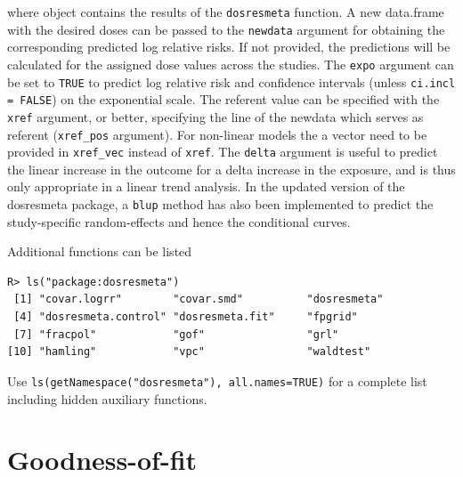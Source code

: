 \documentclass[11pt,a4paper,twoside,openany]{book}\usepackage{knitr}
\newcommand{\pkg}[1]{{\fontseries{b}\selectfont #1}}
\begin{document}
{\noindent where object contains the results of the \texttt{dosresmeta} function. A new data.frame with the desired doses can be passed to the \texttt{newdata} argument for obtaining the corresponding predicted log relative risks. If not provided, the predictions will be calculated for the assigned dose values across the studies. The \texttt{expo} argument can be set to \texttt{TRUE} to predict log relative risk and confidence intervals (unless \texttt{ci.incl = FALSE}) on the exponential scale. The referent value can be specified with the \texttt{xref} argument, or better, specifying the line of the newdata which serves as referent (\texttt{xref\_pos} argument). For non-linear models the a vector need to be provided in \texttt{xref\_vec} instead of \texttt{xref}. The \texttt{delta} argument is useful to predict the linear increase in the outcome for a delta increase in the exposure, and is thus only appropriate in a linear trend analysis. In the updated version of the \pkg{dosresmeta} package, a \texttt{blup} method has also been implemented to predict the study-specific random-effects and hence the conditional curves.

Additional functions can be listed

\begin{knitrout}\footnotesize
{}\color{fgcolor}\begin{kframe}
\begin{verbatim}
R> ls("package:dosresmeta")
 [1] "covar.logrr"        "covar.smd"          "dosresmeta"        
 [4] "dosresmeta.control" "dosresmeta.fit"     "fpgrid"            
 [7] "fracpol"            "gof"                "grl"               
[10] "hamling"            "vpc"                "waldtest"          
\end{verbatim}
\end{kframe}
\end{knitrout}

\noindent Use \texttt{ls(getNamespace("dosresmeta"), all.names=TRUE)} for a complete list including hidden auxiliary functions.


\section{Goodness-of-fit}\label{sec:gof}

}
\end{document}
